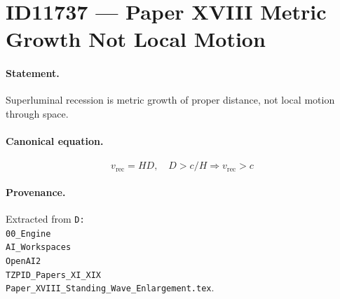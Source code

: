 \section*{ID11737 --- Paper XVIII Metric Growth Not Local Motion}

\paragraph{Statement.}
Superluminal recession is metric growth of proper distance, not local motion through space.

\paragraph{Canonical equation.}
\[
v_{\mathrm{rec}}=H D,\quad D>c/H\Rightarrow v_{\mathrm{rec}}>c
\]

\paragraph{Provenance.}
Extracted from \texttt{D:\\00\_Engine\\AI\_Workspaces\\OpenAI2\\TZPID\_Papers\_XI\_XIX\\Paper\_XVIII\_Standing\_Wave\_Enlargement.tex}.
